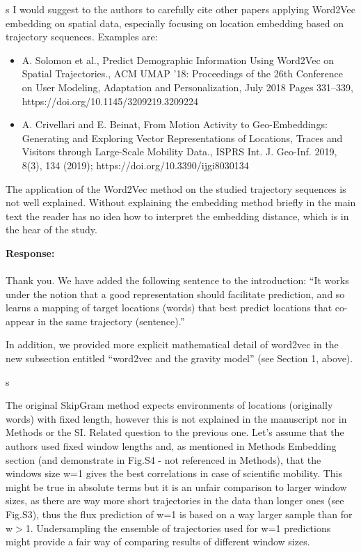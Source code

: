 \documentclass[12pt,draft,a4paper]{article}
\newcounter{comment}[subsection]
\newcommand{\response}[1]{{\noindent \textbf{Response:} \\ \\ \noindent #1}}
\newcommand{\rcomment}[1]{%
\vspace{10pt}
\begin{sectionbox}
s #1
\end{sectionbox}
}
\begin{document}
\rcomment{
	I would suggest to the authors to carefully cite other papers applying Word2Vec embedding on spatial data, especially focusing on location embedding based on trajectory sequences. Examples are:
	\begin{itemize}
		\item A. Solomon et al., Predict Demographic Information Using Word2Vec on Spatial Trajectories., ACM UMAP '18: Proceedings of the 26th Conference on User Modeling, Adaptation and Personalization, July 2018 Pages 331–339, https://doi.org/10.1145/3209219.3209224
		\item A. Crivellari and E. Beinat, From Motion Activity to Geo-Embeddings: Generating and Exploring Vector Representations of Locations, Traces and Visitors through Large-Scale Mobility Data., ISPRS Int. J. Geo-Inf. 2019, 8(3), 134 (2019); https://doi.org/10.3390/ijgi8030134

	\end{itemize}

	The application of the Word2Vec method on the studied trajectory sequences is not well explained. Without explaining the embedding method briefly in the main text the reader has no idea how to interpret the embedding distance, which is in the hear of the study.

}

\response{Thank you.
	We have added the following sentence to the introduction: “It works under the notion that a good representation should facilitate prediction, and so learns a mapping of target locations (words) that best predict locations that co-appear in the same trajectory (sentence).”

	In addition, we provided more explicit mathematical detail of word2vec in the new subsection entitled “word2vec and the gravity model” (see Section 1, above).

}

\rcomment{

	The original SkipGram method expects environments of locations (originally words) with fixed length, however this is not explained in the manuscript nor in Methods or the SI.
	Related question to the previous one. Let’s assume that the authors used fixed window lengths and, as mentioned in Methods Embedding section (and demonstrate in Fig.S4 - not referenced in Methods), that the windows size w=1 gives the best correlations in case of scientific mobility. This might be true in absolute terms but it is an unfair comparison to larger window sizes, as there are way more short trajectories in the data than longer ones (see Fig.S3), thus the flux prediction of w=1 is based on a way larger sample than for w$>$1. Undersampling the ensemble of trajectories used for w=1 predictions might provide a fair way of comparing results of different window sizes.
}
\end{document}
